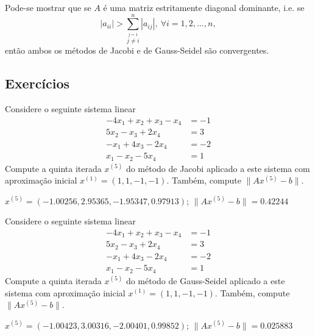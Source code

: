 \begin{obs}{}
  Pode-se mostrar que se $A$ é uma matriz estritamente diagonal dominante, i.e. se
  \begin{equation}
    |a_{ii}| > \sum_{\overset{j=1}{j\neq i}}^n |a_{ij}|,~\forall i=1, 2, \ldots, n,
  \end{equation}
então ambos os métodos de Jacobi e de Gauss-Seidel são convergentes.
\end{obs}

\subsection*{Exercícios}

\begin{exer}\label{exer:jacobi_exec}
  Considere o seguinte sistema linear
  \begin{align}
    -4x_1 + x_2 + x_3 - x_4 &= -1\\
    5x_2 -x_3 + 2x_4 &= 3\\
    -x_1 + 4x_3 - 2x_4 &= -2\\
    x_1 -x_2 -5x_4 &= 1
  \end{align}
  Compute a quinta iterada $x^{(5)}$ do método de Jacobi aplicado a este sistema com aproximação inicial $x^{(1)} = (1, 1, -1, -1)$. Também, compute $\|Ax^{(5)} - b\|$.
\end{exer}
\begin{resp}
  $x^{(5)} = (-1.00256, 2.95365, -1.95347, 0.97913)$; $\|Ax^{(5)}-b\| = 0.42244$
\end{resp}

\begin{exer}\label{exer:gs_exec}
  Considere o seguinte sistema linear
  \begin{align}
    -4x_1 + x_2 + x_3 - x_4 &= -1\\
    5x_2 -x_3 + 2x_4 &= 3\\
    -x_1 + 4x_3 - 2x_4 &= -2\\
    x_1 -x_2 -5x_4 &= 1
  \end{align}
  Compute a quinta iterada $x^{(5)}$ do método de Gauss-Seidel aplicado a este sistema com aproximação inicial $x^{(1)} = (1, 1, -1, -1)$. Também, compute $\|Ax^{(5)} - b\|$.
\end{exer}
\begin{resp}
  $x^{(5)} = (-1.00423, 3.00316, -2.00401, 0.99852)$; $\|Ax^{(5)}-b\| = 0.025883$
\end{resp}


